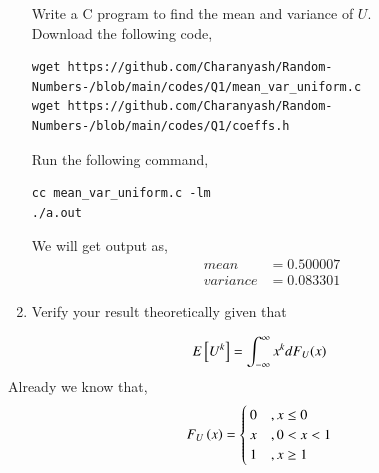 \documentclass[journal,12pt,twocolumn]{IEEEtran}
\renewcommand\thesection{\arabic{section}}
\begin{document}
\begin{enumerate}[label=\thesection.\arabic*,ref=\thesection.\theenumi]
Write a C program to  find the mean and variance of $U$.\\ 
\solution Download the following code,
 \begin{lstlisting}
wget https://github.com/Charanyash/Random-Numbers-/blob/main/codes/Q1/mean_var_uniform.c
wget https://github.com/Charanyash/Random-Numbers-/blob/main/codes/Q1/coeffs.h
 \end{lstlisting}
Run the following command,
 \begin{lstlisting}
cc mean_var_uniform.c -lm
./a.out
 \end{lstlisting}
We will get output as,
\begin{align}
	mean &= 0.500007\\
  variance&= 0.083301
\end{align}
	
\item Verify your result theoretically given that
\end{enumerate}
%
\begin{equation}
E{}\left[U^k\right] = \int_{-\infty}^{\infty}x^kdF_{U}(x)
\end{equation}
\solution Already we know that,
                \begin{equation*}
                                 F_{U}\left(x\right) = \begin{cases} \label{cdf_U}
                                                          0  &, x \leq 0 \\
                                                          x  &, 0<x<1 \\
                                                          1  & , x \geq 1
                                                        \end{cases}
                 \end{equation*}
\end{document}
